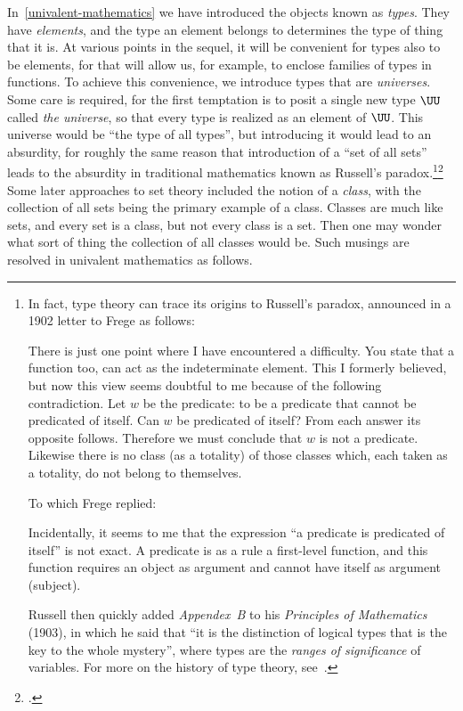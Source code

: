 In~\cref{univalent-mathematics} we have introduced the objects known as \emph{types}.  They have \emph{elements}, and the type an
element belongs to determines the type of thing that it is.  At various points in the sequel, it will be convenient for types also to be
elements, for that will allow us, for example, to enclose families of types in functions.  To achieve this
convenience, we introduce types that are \emph{universes}.  Some care is required, for the first temptation is to posit a
single new type $\UU$ called \emph{the universe}, so that every type is realized as an element of $\UU$.  This universe would be ``the type of
all types'', but introducing it would lead to an absurdity, for roughly the same reason that introduction of a ``set of all sets'' leads to the absurdity
in traditional mathematics known as Russell's paradox.\footnote{%
  In fact, type theory can trace its origins to Russell's paradox,
  announced in a 1902 letter to Frege as follows:\\
  \begin{adjustwidth}{\parindent}{}
    There is just one point where I have encountered a difficulty.
    You state that a function too, can act as the indeterminate element.
    This I formerly believed,
    but now this view seems doubtful to me because of the following contradiction.
    Let $w$ be the predicate: to be a predicate that cannot be predicated of itself.
    Can $w$ be predicated of itself? From each answer its opposite follows.
    Therefore we must conclude that $w$ is not a predicate.
    Likewise there is no class (as a totality) of those classes which,
    each taken as a totality, do not belong to themselves.
  \end{adjustwidth}
  To which Frege replied:
  \begin{adjustwidth}{\parindent}{}
  Incidentally, it seems to me that the expression
  ``a predicate is predicated of itself'' is not exact.
  A predicate is as a rule a first-level function,
  and this function requires an object as argument
  and cannot have itself as argument (subject).
  \end{adjustwidth}
  Russell then quickly added \emph{Appendex~B} to his
  \emph{Principles of Mathematics} (1903), in which he said that
  ``it is the distinction of logical types that is the key to the whole mystery'',
  where types are the \emph{ranges of significance} of variables.
  For more on the history of type theory,
  see~\citeauthor{sep-type-theory}\footnotemark{}.}\footcitetext{sep-type-theory}
  Some later approaches to set theory included the notion of a \emph{class}, with the collection of all sets being the primary example of a class.
  Classes are much like sets, and every set is a class, but not every class is a set.
  Then one may wonder what sort of thing the collection of all classes would be.  Such
  musings are resolved in univalent mathematics as follows.

